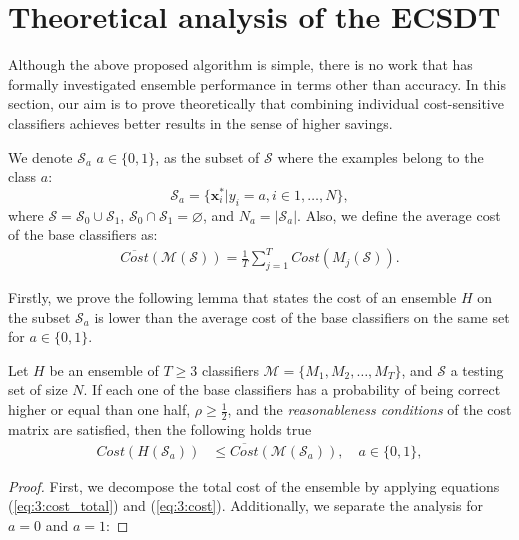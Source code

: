 {\section{Theoretical analysis of the ECSDT}
\label{sec:9:theoretical}

  Although the above proposed algorithm is simple, there is %
  no work that has formally 
  investigated ensemble performance in terms other than accuracy. In this section, our aim is to 
  prove theoretically that combining individual cost-sensitive classifiers achieves better results 
  in the sense of higher savings.
  
  We denote $\mathcal{S}_a$ $a\in \{0,1\}$, as the subset of $\mathcal{S}$ 
  where the examples belong to the class $a$:
  \begin{equation}\label{eq:9:S_a}
    \mathcal{S}_a = \{\mathbf{x}_i^* \vert y_i = a, i \in 1,\dots,N\},
  \end{equation}
  where $\mathcal{S}=\mathcal{S}_0 \cup \mathcal{S}_1$, $\mathcal{S}_0 \cap \mathcal{S}_1 = 
  \varnothing$, and $N_a=\vert \mathcal{S}_a \vert$. Also, we define the average cost of the base 
  classifiers as:
  \begin{align}\label{eq:9:avg_cost}
    \overline{Cost} (\mathcal{M}(\mathcal{S}))= \frac{1}{T} \sum_{j=1}^{T} Cost(M_j(\mathcal{S})). 
  \end{align}
  
  \noindent Firstly, we prove the following lemma that states the cost of an ensemble $H$ on the 
  subset $\mathcal{S}_a$ is lower than the average cost of the base classifiers on the same set for 
  $a  \in \{0,1\}$.

  \begin{lemma}\label{lemma1}
  Let $H$ be an ensemble of $T\ge3$ classifiers $\mathcal{M}=\{M_1, M_2,\dots,M_T\}$, and 
  $\mathcal{S}$ a testing set of size $N$. If each one of the base classifiers has a probability 
  of being correct higher or equal than one half, $\rho \ge \frac{1}{2}$, and the 
  \textit{reasonableness conditions} of the cost matrix are satisfied, then the following holds true
  \begin{align}\label{eq:9:lemma}
    Cost(H(\mathcal{S}_a)) &\le \overline{Cost} (\mathcal{M}(\mathcal{S}_a)) , \quad a  \in\{0,1\},  
 \end{align}
  \end{lemma}
  
  \noindent\begin{proof}
  First, we decompose the total cost of the ensemble by applying equations (\ref{eq:3:cost_total}) 
  and (\ref{eq:3:cost}). Additionally, we separate the analysis for $a=0$ and $a=1$:


\end{proof}}
